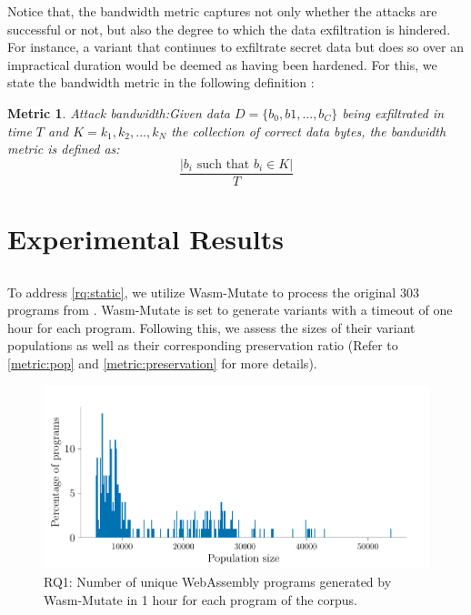 \documentclass[a4paper,fleqn]{cas-dc}
\newcommand{\tool}{{\sc Wasm-Mutate}\xspace}
\newcommand{\Wasm}{WebAssembly\xspace}
\newcommand{\wasm}{\Wasm}
\newtheorem{metric}{Metric}
\begin{document}
Notice that, the bandwidth metric captures not only whether the attacks are successful or not, but also the degree to which the data exfiltration is hindered.
For instance, a variant that continues to exfiltrate secret data but does so over an impractical duration would be deemed as having been hardened. 
For this, we state the bandwidth metric in the following definition :

\begin{metric}{Attack bandwidth:}\label{metric:ber}
Given data $D=\{b_0, b1, ..., b_C\}$ being exfiltrated in time $T$ and $K = {k_1, k_2, ..., k_N}$ the collection of correct data bytes, the bandwidth metric is defined as:
$$
    \frac{|b_i\text{ such that } b_i \in K|}{T}
$$
\end{metric}




\section{Experimental Results}
\label{results}

\subsection{\rqstatic}
\label{rq:static:results}

\newcommand{\preserved}{62\%\xspace}

To address \ref{rq:static}, we utilize \tool to process the original 303 programs from \cite{arteaga2020crow}. 
\tool is set to generate variants with a timeout of one hour for each program. 
Following this, we assess the sizes of their variant populations as well as their corresponding preservation ratio (Refer to \autoref{metric:pop} and \autoref{metric:preservation} for more details).

\begin{figure}
    \centering
    \includegraphics[width=\linewidth]{plots/rq1/population.pdf}
    \caption{RQ1: Number of unique \wasm programs generated by \tool in 1 hour for each program of the corpus.}
  \label{rq1:plot:population}
\end{figure}
\end{document}
